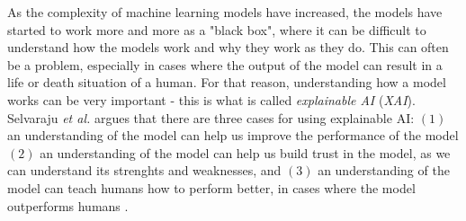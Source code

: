 \documentclass[./main.tex]{subfiles}
\begin{document}
As the complexity of machine learning models have increased, the models have started to work more and more as a "black box", where it can be difficult to understand how the models work and why they work as they do. This can often be a problem, especially in cases where the output of the model can result in a life or death situation of a human. For that reason, understanding how a model works can be very important - this is what is called \textit{explainable AI} (\textit{XAI}). Selvaraju \textit{et al.} \cite{Selvaraju} argues that there are three cases for using explainable AI: $(1)$ an understanding of the model can help us improve the performance of the model $(2)$ an understanding of the model can help us build trust in the model, as we can understand its strenghts and weaknesses, and $(3)$ an understanding of the model can teach humans how to perform better, in cases where the model outperforms humans \cite{Selvaraju}.
\end{document}
